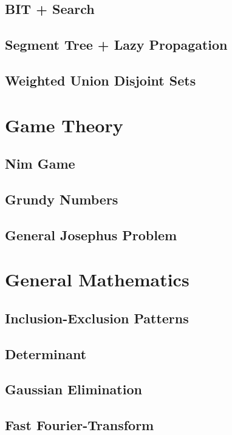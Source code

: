 \documentclass[twocolumn]{article}
\begin{document}
		\subsection{BIT + Search}
			
		\subsection{Segment Tree + Lazy Propagation}
			
		\subsection{Weighted Union Disjoint Sets}
			
	\section{Game Theory}
		\subsection{Nim Game}
			
		\subsection{Grundy Numbers}
			
		\subsection{General Josephus Problem}
	\section{General Mathematics}
		\subsection{Inclusion-Exclusion Patterns}
			
		\subsection{Determinant}
			
		\subsection{Gaussian Elimination}
			
		\subsection{Fast Fourier-Transform}
			
\end{document}
